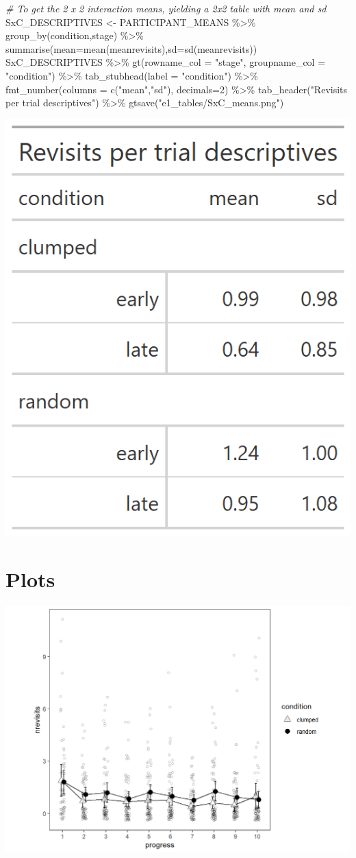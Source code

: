 \documentclass[
]{book}
\newenvironment{Shaded}{\begin{snugshade}}{\end{snugshade}}
\newcommand{\AttributeTok}[1]{\textcolor[rgb]{0.77,0.63,0.00}{#1}}
\newcommand{\CommentTok}[1]{\textcolor[rgb]{0.56,0.35,0.01}{\textit{#1}}}
\newcommand{\DecValTok}[1]{\textcolor[rgb]{0.00,0.00,0.81}{#1}}
\newcommand{\FunctionTok}[1]{\textcolor[rgb]{0.00,0.00,0.00}{#1}}
\newcommand{\NormalTok}[1]{#1}
\newcommand{\OtherTok}[1]{\textcolor[rgb]{0.56,0.35,0.01}{#1}}
\newcommand{\SpecialCharTok}[1]{\textcolor[rgb]{0.00,0.00,0.00}{#1}}
\newcommand{\StringTok}[1]{\textcolor[rgb]{0.31,0.60,0.02}{#1}}
\begin{document}
\begin{Shaded}
\begin{Highlighting}[]
\CommentTok{\# To get the 2 x 2 interaction means, yielding a 2x2 table with mean and sd}
\NormalTok{SxC\_DESCRIPTIVES }\OtherTok{\textless{}{-}}\NormalTok{ PARTICIPANT\_MEANS }\SpecialCharTok{\%\textgreater{}\%} \FunctionTok{group\_by}\NormalTok{(condition,stage) }\SpecialCharTok{\%\textgreater{}\%} \FunctionTok{summarise}\NormalTok{(}\AttributeTok{mean=}\FunctionTok{mean}\NormalTok{(meanrevisits),}\AttributeTok{sd=}\FunctionTok{sd}\NormalTok{(meanrevisits))}
\NormalTok{SxC\_DESCRIPTIVES }\SpecialCharTok{\%\textgreater{}\%} 
  \FunctionTok{gt}\NormalTok{(}\AttributeTok{rowname\_col =} \StringTok{"stage"}\NormalTok{, }\AttributeTok{groupname\_col =} \StringTok{"condition"}\NormalTok{) }\SpecialCharTok{\%\textgreater{}\%} 
  \FunctionTok{tab\_stubhead}\NormalTok{(}\AttributeTok{label =} \StringTok{"condition"}\NormalTok{) }\SpecialCharTok{\%\textgreater{}\%} 
  \FunctionTok{fmt\_number}\NormalTok{(}\AttributeTok{columns =} \FunctionTok{c}\NormalTok{(}\StringTok{"mean"}\NormalTok{,}\StringTok{"sd"}\NormalTok{), }\AttributeTok{decimals=}\DecValTok{2}\NormalTok{) }\SpecialCharTok{\%\textgreater{}\%} 
  \FunctionTok{tab\_header}\NormalTok{(}\StringTok{"Revisits per trial descriptives"}\NormalTok{) }\SpecialCharTok{\%\textgreater{}\%} 
  \FunctionTok{gtsave}\NormalTok{(}\StringTok{"e1\_tables/SxC\_means.png"}\NormalTok{)}
\end{Highlighting}
\end{Shaded}

\includegraphics[width=0.33\linewidth]{e1_figures/SxC_Descriptives-1}

\hypertarget{plots}{%
\section{Plots}\label{plots}}

\includegraphics[width=0.5\linewidth]{e1_figures/progress-revisits-1}
\end{document}
